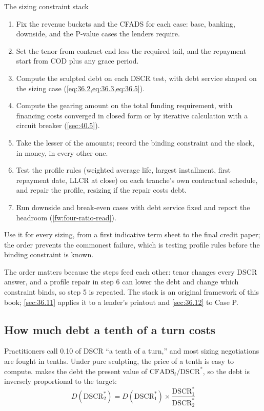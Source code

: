 \begin{framework}[label={fw:sizing-constraint-stack}]{The sizing constraint stack}
\begin{enumerate}
\item Fix the revenue buckets and the CFADS for each case: base, banking, downside, and the P-value cases the lenders require.
\item Set the tenor from contract end less the required tail, and the repayment start from COD plus any grace period.
\item Compute the sculpted debt on each DSCR test, with debt service shaped on the sizing case (\cref{eq:36.2,eq:36.3,eq:36.5}).
\item Compute the gearing amount on the total funding requirement, with financing costs converged in closed form or by iterative calculation with a circuit breaker (\cref{sec:40.5}).
\item Take the lesser of the amounts; record the binding constraint and the slack, in money, in every other one.
\item Test the profile rules (weighted average life, largest installment, first repayment date, LLCR at close) on each tranche's own contractual schedule, and repair the profile, resizing if the repair costs debt.
\item Run downside and break-even cases with debt service fixed and report the headroom (\cref{fw:four-ratio-read}).
\end{enumerate}
Use it for every sizing, from a first indicative term sheet to the final credit paper; the order prevents the commonest failure, which is testing profile rules before the binding constraint is known.
\end{framework}

The order matters because the steps feed each other: tenor changes every DSCR answer, and a profile repair in step 6 can lower the debt and change which constraint binds, so step 5 is repeated. The stack is an original framework of this book; \cref{sec:36.11} applies it to a lender's printout and \cref{sec:36.12} to Case P.

\subsection{How much debt a tenth of a turn costs}\label{ssec:36.3.3}

Practitioners call 0.10\x{} of DSCR ``a tenth of a turn,'' and most sizing negotiations are fought in tenths. Under pure sculpting, the price of a tenth is easy to compute.  makes the debt the present value of $\mathrm{CFADS}_t/\mathrm{DSCR}^{*}$, so the debt is inversely proportional to the target:
\begin{equation*}
D(\mathrm{DSCR}^{*}_2) = D(\mathrm{DSCR}^{*}_1) \times \frac{\mathrm{DSCR}^{*}_1}{\mathrm{DSCR}^{*}_2}
\end{equation*}

